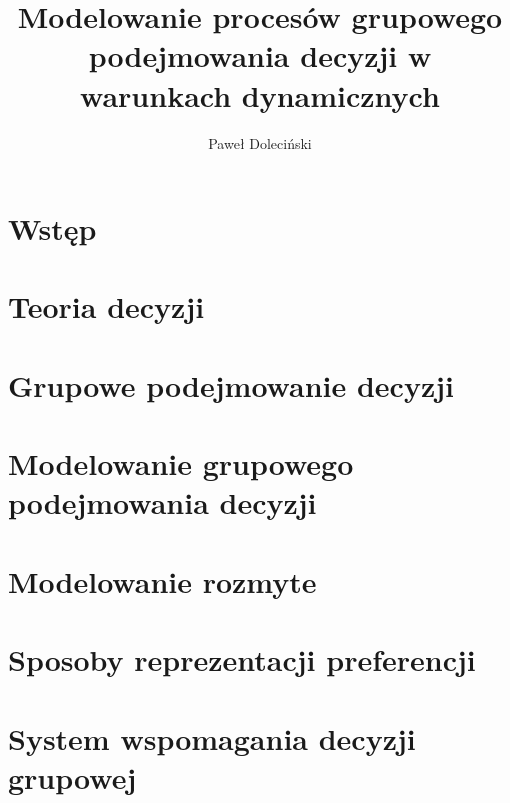\documentclass[12pt,oneside]{memoir}
\title{Modelowanie procesów grupowego podejmowania decyzji w warunkach dynamicznych}
\author{Paweł Doleciński}
\begin{document}
    \renewcommand{\figurename}{Rys.}    %
    \renewcommand{\tablename}{Tab.}     %
    \thispagestyle{empty}               %
    
    \stronatytulowa  

	
    \newpage

	\hypersetup{linkcolor=black}

    \tableofcontents*
	\newpage

	\chapter*{Wstęp}
	

	\chapter{Teoria decyzji}
  	
	
	\chapter{Grupowe podejmowanie decyzji}
	
	
	\chapter{Modelowanie grupowego podejmowania decyzji}
	
	
	\chapter{Modelowanie rozmyte}
	
	
	\chapter{Sposoby reprezentacji preferencji}
	
	
	\chapter{System wspomagania decyzji grupowej}
	
	
\end{document}
